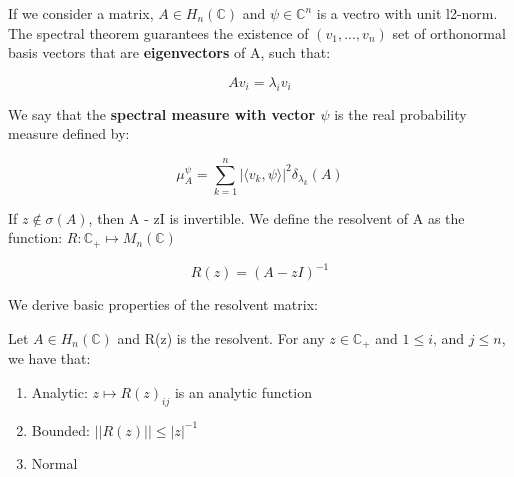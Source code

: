\documentclass[class=article, crop=false]{standalone}
\begin{document}
	If we consider a matrix, $A \in H_n(\mathbb{C})$ and $\psi \in \mathbb{C}^n$ is a vectro with unit l2-norm. The spectral theorem guarantees the existence of $(v_1, ..., v_n)$ set of orthonormal basis vectors that are \textbf{eigenvectors} of A, such that:

		$$Av_i = \lambda_i v_i$$

	We say that the \textbf{spectral measure with vector $\psi$} is the real probability measure defined by:

		$$\mu_A^\psi = \sum_{k=1}^n |\langle v_k,  \psi \rangle |^2 \delta_{\lambda_k}(A)$$

	If $z \notin \sigma(A)$, then A - zI is invertible. We define the resolvent of A as the function: $R: \mathbb{C}_+ \mapsto M_n(\mathbb{C})$
		
		$$R(z) = (A - zI)^{-1}$$

	We derive basic properties of the resolvent matrix:

	\begin{lemma} 
		Let $A \in H_n(\mathbb{C})$ and R(z) is the resolvent. For any $z \in \mathbb{C}_+$ and $1 \le i$, and $j \le n$, we have that:

		\begin{enumerate}
			\item Analytic: $z \mapsto R(z)_{ij}$ is an analytic function
			\item Bounded: $||R(z)|| \le |z|^{-1}$
			\item Normal
		\end{enumerate}
	\end{lemma}
\end{document}
